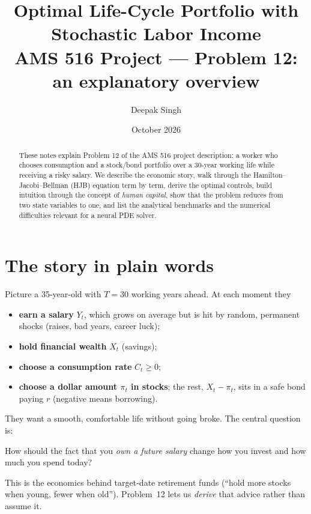 \documentclass[11pt]{article}
\title{\textbf{Optimal Life-Cycle Portfolio with Stochastic Labor Income}\\[4pt]
\large AMS 516 Project --- Problem 12: an explanatory overview}
\author{Deepak Singh}
\date{October 2026}
\begin{document}
\maketitle

\begin{abstract}
These notes explain Problem 12 of the AMS 516 project description: a worker who
chooses consumption and a stock/bond portfolio over a 30-year working life while
receiving a risky salary. We describe the economic story, walk through the
Hamilton--Jacobi--Bellman (HJB) equation term by term, derive the optimal controls,
build intuition through the concept of \emph{human capital}, show that the problem
reduces from two state variables to one, and list the analytical benchmarks and the
numerical difficulties relevant for a neural PDE solver.
\end{abstract}

\setcounter{tocdepth}{1}
\tableofcontents

\section{The story in plain words}

Picture a 35-year-old with $T=30$ working years ahead. At each moment they
\begin{itemize}
  \item \textbf{earn a salary} $Y_t$, which grows on average but is hit by random,
        permanent shocks (raises, bad years, career luck);
  \item \textbf{hold financial wealth} $X_t$ (savings);
  \item \textbf{choose a consumption rate} $C_t \ge 0$;
  \item \textbf{choose a dollar amount $\pi_t$ in stocks}; the rest, $X_t-\pi_t$,
        sits in a safe bond paying $r$ (negative means borrowing).
\end{itemize}
They want a smooth, comfortable life without going broke. The central question is:

\begin{keyidea}
How should the fact that you \emph{own a future salary} change how you invest and
how much you spend today?
\end{keyidea}

This is the economics behind target-date retirement funds (``hold more stocks when
young, fewer when old''). Problem~12 lets us \emph{derive} that advice rather than
assume it.
\end{document}

